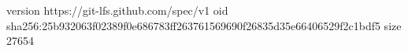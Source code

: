 version https://git-lfs.github.com/spec/v1
oid sha256:25b932063f02389f0e686783ff263761569690f26835d35e66406529f2c1bdf5
size 27654
